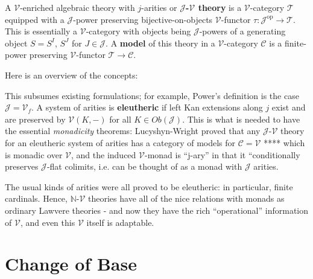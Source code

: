\documentclass[a4paper,UKenglish]{article}
\theoremstyle{definition}
\newcommand{\op}{\mathrm{op}}
\newcommand{\NN}{\mathbb{N}}
\newcommand{\V}{\mathscr{V}}
\newcommand{\C}{\mathscr{C}}
\newcommand{\T}{\mathscr{T}}
\newcommand{\J}{\mathscr{J}}
\begin{document}
A $\V$-enriched algebraic theory with $j$-arities or \textbf{$\J$-$\V$ theory} is a $\V$-category $\T$ equipped with a $\J$-power preserving bijective-on-objects $\V$-functor $\tau:\J^\op \to \T$. This is essentially a $\V$-category with objects being $\J$-powers of a generating object $S = S^I$, $S^J$ for $J \in \J$. A \textbf{model} of this theory in a $\V$-category $\C$ is a finite-power preserving $\V$-functor $\T \to \C$.

Here is an overview of the concepts: 

\begin{center}
\end{center}

This subsumes existing formulations; for example, Power's definition is the case $\J = \V_f$. A system of arities is \textbf{eleutheric} if left Kan extensions along $j$ exist and are preserved by $\V(K,-)$ for all $K \in Ob(\J)$. This is what is needed to have the essential \textit{monadicity} theorems: Lucyshyn-Wright proved that any $\J$-$\V$ theory for an eleutheric system of arities has a category of models for $\C = \V$ **** which is monadic over $\V$, and the induced $\V$-monad is ``j-ary'' in that it ``conditionally preserves $\J$-flat colimits, i.e. can be thought of as a monad with $\J$ arities.

The usual kinds of arities were all proved to be eleutheric: in particular, finite cardinals. Hence, $\NN$-$\V$ theories have all of the nice relations with monads as ordinary Lawvere theories - and now they have the rich ``operational'' information of $\V$, and even this $\V$ itself is adaptable.

\section{Change of Base}
\end{document}
